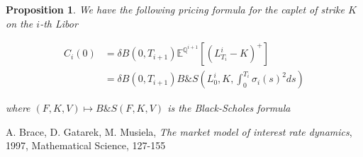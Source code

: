 \documentclass{article}
\newtheorem{proposition}[theorem]{Proposition}
\begin{document}
\begin{proposition}
We have the following pricing formula for the caplet of strike $K$ on the $i$-th Libor

\begin{equation}
\begin{aligned}
	C_i(0) &= \delta B\left(0,T_{i+1}\right)\mathbb{E}^{\mathbb{Q}^{i+1}} \left[\left(L^i_{T_i}-K\right)^+\right]\\
	&= \delta B\left(0,T_{i+1}\right) B\&S\left(L^i_0, K, \int_0^{T_i} \sigma_i(s)^2 ds\right)
\end{aligned}
\end{equation}

\noindent where $(F,K,V) \mapsto B\&S(F,K,V)$ is the Black-Scholes formula

\end{proposition}
\begin{thebibliography}{9}
	A. Brace, D. Gatarek, M. Musiela, \emph{The market model of interest rate dynamics}, 1997, Mathematical Science, 127-155
\end{thebibliography}
\end{document}
